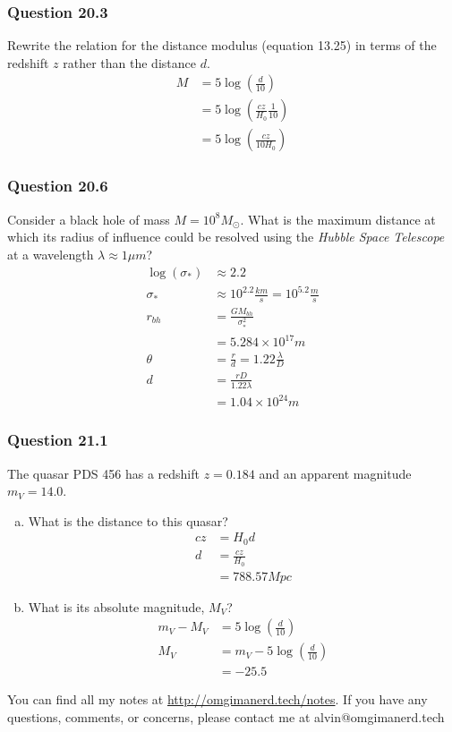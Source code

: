 \documentclass{math}
\begin{document}
\subsubsection*{Question 20.3}
Rewrite the relation for the distance modulus (equation 13.25) in terms of the
redshift \( z \) rather than the distance \( d \).
\begin{align*}
  M &= 5\log\left(\frac{d}{10}\right) \\
  &= 5\log\left(\frac{cz}{H_0}\frac{1}{10}\right) \\
  &= 5\log\left(\frac{cz}{10H_0}\right)
\end{align*}

\subsubsection*{Question 20.6}
Consider a black hole of mass \( M = 10^8M_{\odot} \). What is the maximum
distance at which its radius of influence could be resolved using the
\textit{Hubble Space Telescope} at a wavelength \( \lambda \approx 1\mu m \)?
\begin{align*}
  \log(\sigma_*) &\approx 2.2 \\
  \sigma_* &\approx 10^{2.2}\frac{km}{s} = 10^{5.2}\frac{m}{s} \\
  r_{bh} &= \frac{GM_{bh}}{\sigma_*^2} \\
  &= 5.284\times10^{17}m \\
  \theta &= \frac{r}{d} = 1.22\frac{\lambda}{D} \\
  d &= \frac{rD}{1.22\lambda} \\
  &= 1.04\times10^{24}m
\end{align*}

\subsubsection*{Question 21.1}
The quasar PDS 456 has a redshift \( z = 0.184 \) and an apparent magnitude
\( m_V = 14.0 \).
\begin{enumerate}[(a)]
  \item What is the distance to this quasar?
  \begin{align*}
    cz &= H_0d \\
    d &= \frac{cz}{H_0} \\
    &= 788.57 Mpc
  \end{align*}
  \item What is its absolute magnitude, \( M_V \)?
  \begin{align*}
    m_V-M_V &= 5\log\left(\frac{d}{10}\right) \\
    M_V &= m_V-5\log\left(\frac{d}{10}\right) \\
    &= -25.5
  \end{align*}
\end{enumerate}

\begin{center}
  You can find all my notes at \url{http://omgimanerd.tech/notes}. If you have
  any questions, comments, or concerns, please contact me at
  alvin@omgimanerd.tech
\end{center}
\end{document}
